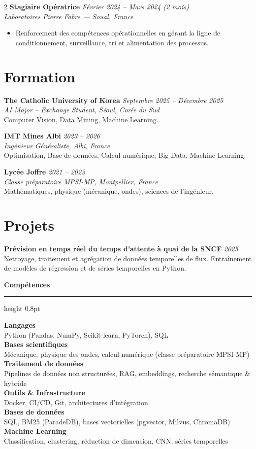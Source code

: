\documentclass[10.5pt,a4paper]{article}
\newcommand{\sectionrule}{\vspace{-6pt}{\color{accent}\hrule height 1pt}\vspace{2pt}}
\newcommand{\subsectitle}[1]{%
  {\color{accent}\bfseries\large #1}\\[-2pt]
  {\color{accent}\hrule height 0.8pt}\vspace{4pt}
}
\newcommand{\cvexp}[5]{%
  \noindent\textbf{#1} \hfill {\itshape\color{graytext}\small #4}\\
  {\itshape #2 --- #3}\\[-2pt]
  #5
  \vspace{5pt}
}
\newcommand{\cvedu}[5]{%
  \noindent\textbf{#1} \hfill {\itshape\color{graytext}\small #4}\\
  {\itshape #2, #3}\\[1pt]
  {\small #5}
  \vspace{2pt}
}
\newcommand{\cvproject}[3]{%
  \noindent\textbf{#1} \hfill {\itshape\color{graytext}\small #2}\\[1pt]
  {\small #3}
  \vspace{2pt}
}
\newcommand{\sidebarline}[2]{%
  \noindent\textbf{\small #1}\\
  {\small #2}\\[3pt]
}
\begin{document}
\begin{paracol}{2}
\cvexp{Stagiaire Opératrice}{Laboratoires Pierre Fabre}{Soual, France}{Février 2024 -- Mars 2024 (2 mois)}{%
  \begin{itemize}[leftmargin=12pt, itemsep=2pt, topsep=0pt, partopsep=0pt, parsep=0pt]
    \item Renforcement des compétences opérationnelles en gérant la ligne de conditionnement, surveillance, tri et alimentation des processus.
  \end{itemize}
}

\section*{Formation}
\sectionrule

\cvedu{The Catholic University of Korea}{AI Major -- Exchange Student}{Séoul, Corée du Sud}{Septembre 2025 -- Décembre 2025}{Computer Vision, Data Mining, Machine Learning.}

\cvedu{IMT Mines Albi}{Ingénieur Généraliste}{Albi, France}{2023 -- 2026}{Optimisation, Base de données, Calcul numérique, Big Data, Machine Learning.}

\cvedu{Lycée Joffre}{Classe préparatoire MPSI-MP}{Montpellier, France}{2021 -- 2023}{Mathématiques, physique (mécanique, ondes), sciences de l'ingénieur.}

\section*{Projets}
\sectionrule

\cvproject{Prévision en temps réel du temps d'attente à quai de la SNCF}{2025}{Nettoyage, traitement et agrégation de données temporelles de flux. Entraînement de modèles de régression et de séries temporelles en Python.}

\switchcolumn

\vspace{2pt}

\subsectitle{Compétences}

\sidebarline{Langages}{Python (Pandas, NumPy, Scikit-learn, PyTorch), SQL}
\sidebarline{Bases scientifiques}{Mécanique, physique des ondes, calcul numérique (classe préparatoire MPSI-MP)}
\sidebarline{Traitement de données}{Pipelines de données non structurées, RAG, embeddings, recherche sémantique \& hybride}
\sidebarline{Outils \& Infrastructure}{Docker, CI/CD, Git, architectures d'intégration}
\sidebarline{Bases de données}{SQL, BM25 (ParadeDB), bases vectorielles (pgvector, Milvus, ChromaDB)}
\sidebarline{Machine Learning}{Classification, clustering, réduction de dimension, CNN, séries temporelles}


\end{paracol}
\end{document}
